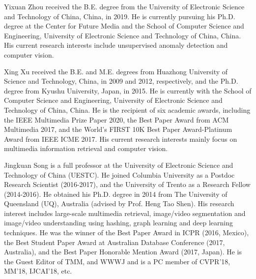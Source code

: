 \documentclass[lettersize,journal]{IEEEtran}
\begin{document}
\vspace{-10pt}
\begin{IEEEbiography}
	{Yixuan Zhou}
  received the B.E. degree from the University of Electronic Science and Technology of China, China, in 2019. He is currently pursuing his Ph.D. degree at the Center for Future Media and the School of Computer Science and Engineering, University of Electronic Science and Technology of China, China. His current research interests include unsupervised anomaly detection and computer vision.
\end{IEEEbiography}
\vspace{-10pt}
\begin{IEEEbiography}
	{Xing Xu}
	received the B.E. and M.E. degrees from Huazhong University of Science and Technology, China, in 2009 and 2012, respectively, and the Ph.D. degree from Kyushu University, Japan, in 2015. He is currently with the School of Computer Science and Engineering, University of Electronic Science and Technology of China, China. He is the recipient of six academic awards, including the IEEE Multimedia Prize Paper 2020, the Best Paper Award from ACM Multimedia 2017, and the World's FIRST 10K Best Paper Award-Platinum Award from IEEE ICME 2017. His current research interests mainly focus on multimedia information retrieval and computer vision.
\end{IEEEbiography}
\vspace{-10pt}
\begin{IEEEbiography}
	{Jingkuan Song}
	is a full professor at the University of Electronic Science and Technology of China (UESTC). He joined Columbia University as a Postdoc Research Scientist (2016-2017), and the University of Trento as a Research Fellow (2014-2016). He obtained his Ph.D. degree in 2014 from The University of Queensland (UQ), Australia (advised by Prof. Heng Tao Shen). His research interest includes large-scale multimedia retrieval, image/video segmentation and image/video understanding using hashing, graph learning and deep learning techniques. He was the winner of the Best Paper Award in ICPR (2016, Mexico), the Best Student Paper Award at Australian Database Conference (2017, Australia), and the Best Paper Honorable Mention Award (2017, Japan). He is the Guest Editor of TMM, and WWWJ and is a PC member of CVPR’18, MM'18, IJCAI'18, etc.
\end{IEEEbiography}
\end{document}
